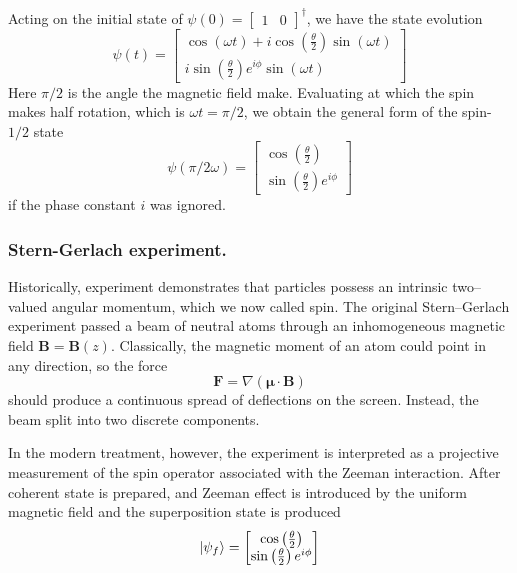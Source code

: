 \documentclass[../../../main.tex]{subfiles}
\begin{document}
Acting on the initial state of $\psi(0)= \begin{bmatrix}   1&0 \end{bmatrix} ^\dagger$, we have the state evolution
\begin{equation*}
  \psi(t) = \begin{bmatrix}
    \cos(\omega t) + i\cos\left( \frac{\theta }{2} \right)  \sin(\omega t) \\
    i\sin\left( \frac{\theta }{2} \right)  e^{i\phi}\sin(\omega t)
  \end{bmatrix}
\end{equation*}
Here $\pi/2$ is the angle the magnetic field make.
Evaluating at which the spin makes half rotation, which is $\omega t =\pi/2$, we obtain the general form of the spin-$1/2$ state
\begin{equation*}
  \psi(\pi/2\omega) = \begin{bmatrix}
    \cos\left( \frac{\theta }{2} \right) \\
    \sin\left( \frac{\theta }{2} \right)  e^{i\phi}
  \end{bmatrix}
\end{equation*}
if the phase constant $i$ was ignored.

\subsubsection{Stern-Gerlach experiment.}
Historically, experiment demonstrates that particles possess an intrinsic two–valued angular momentum, which we now  called spin.
The original Stern–Gerlach experiment passed a beam of neutral atoms through an inhomogeneous magnetic field $\mathbf{B}=\mathbf{B}(z)$.
Classically, the magnetic moment of an atom could point in any direction, so the force
\begin{equation*}
  \mathbf{F} = \nabla (\boldsymbol{\mu}\cdot \mathbf{B})
\end{equation*}
should produce a continuous spread of deflections on the screen.
Instead, the beam split into two discrete components.

In the modern treatment, however, the experiment is interpreted as a projective measurement of the spin operator associated with the Zeeman interaction.
After coherent state is prepared, and Zeeman effect is introduced by the uniform magnetic field and the superposition state is produced
\begin{equation*}
  \ket{\psi_f}
  = \begin{bmatrix}
    \cos\left( \frac{\theta }{2} \right) \\
    \sin\left( \frac{\theta }{2} \right)  e^{i\phi}
  \end{bmatrix}
\end{equation*}
\end{document}
